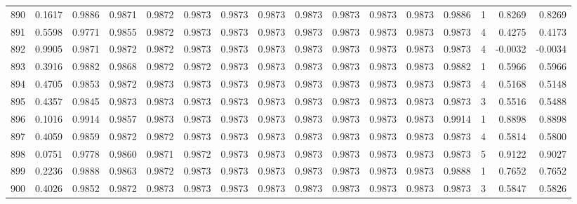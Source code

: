 \begin{tabular}{lrrrrrrrrrrrrrrr}
890 &      0.1617 &  0.9886 &  0.9871 &  0.9872 &  0.9873 &  0.9873 &  0.9873 &  0.9873 &  0.9873 &  0.9873 &   0.9873 &     0.9886 &      1 &                    0.8269 &                     0.8269 \\
891 &      0.5598 &  0.9771 &  0.9855 &  0.9872 &  0.9873 &  0.9873 &  0.9873 &  0.9873 &  0.9873 &  0.9873 &   0.9873 &     0.9873 &      4 &                    0.4275 &                     0.4173 \\
892 &      0.9905 &  0.9871 &  0.9872 &  0.9872 &  0.9873 &  0.9873 &  0.9873 &  0.9873 &  0.9873 &  0.9873 &   0.9873 &     0.9873 &      4 &                   -0.0032 &                    -0.0034 \\
893 &      0.3916 &  0.9882 &  0.9868 &  0.9872 &  0.9872 &  0.9873 &  0.9873 &  0.9873 &  0.9873 &  0.9873 &   0.9873 &     0.9882 &      1 &                    0.5966 &                     0.5966 \\
894 &      0.4705 &  0.9853 &  0.9872 &  0.9873 &  0.9873 &  0.9873 &  0.9873 &  0.9873 &  0.9873 &  0.9873 &   0.9873 &     0.9873 &      4 &                    0.5168 &                     0.5148 \\
895 &      0.4357 &  0.9845 &  0.9873 &  0.9873 &  0.9873 &  0.9873 &  0.9873 &  0.9873 &  0.9873 &  0.9873 &   0.9873 &     0.9873 &      3 &                    0.5516 &                     0.5488 \\
896 &      0.1016 &  0.9914 &  0.9857 &  0.9873 &  0.9873 &  0.9873 &  0.9873 &  0.9873 &  0.9873 &  0.9873 &   0.9873 &     0.9914 &      1 &                    0.8898 &                     0.8898 \\
897 &      0.4059 &  0.9859 &  0.9872 &  0.9872 &  0.9873 &  0.9873 &  0.9873 &  0.9873 &  0.9873 &  0.9873 &   0.9873 &     0.9873 &      4 &                    0.5814 &                     0.5800 \\
898 &      0.0751 &  0.9778 &  0.9860 &  0.9871 &  0.9872 &  0.9873 &  0.9873 &  0.9873 &  0.9873 &  0.9873 &   0.9873 &     0.9873 &      5 &                    0.9122 &                     0.9027 \\
899 &      0.2236 &  0.9888 &  0.9863 &  0.9872 &  0.9873 &  0.9873 &  0.9873 &  0.9873 &  0.9873 &  0.9873 &   0.9873 &     0.9888 &      1 &                    0.7652 &                     0.7652 \\
900 &      0.4026 &  0.9852 &  0.9872 &  0.9873 &  0.9873 &  0.9873 &  0.9873 &  0.9873 &  0.9873 &  0.9873 &   0.9873 &     0.9873 &      3 &                    0.5847 &                     0.5826 \\

\end{tabular}
